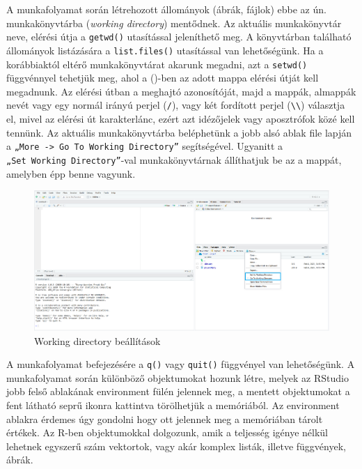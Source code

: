 \documentclass[
]{book}
\begin{document}
A munkafolyamat során létrehozott állományok (ábrák, fájlok) ebbe az ún.
munkakönyvtárba (\emph{working directory}) mentődnek. Az aktuális
munkakönyvtár neve, elérési útja a \texttt{getwd()} utasítással
jeleníthető meg. A könyvtárban található állományok listázására a
\texttt{list.files()} utasítással van lehetőségünk. Ha a korábbiaktól
eltérő munkakönyvtárat akarunk megadni, azt a \texttt{setwd()}
függvénnyel tehetjük meg, ahol a ()-ben az adott mappa elérési útját
kell megadnunk. Az elérési útban a meghajtó azonosítóját, majd a mappák,
almappák nevét vagy egy normál irányú perjel (\texttt{/}), vagy két
fordított perjel (\texttt{\textbackslash{}\textbackslash{}}) választja
el, mivel az elérési út karakterlánc, ezért azt idézőjelek vagy
aposztrófok közé kell tennünk. Az aktuális munkakönyvtárba beléphetünk a
jobb alsó ablak file lapján a
\texttt{„More\ -\textgreater{}\ Go\ To\ Working\ Directory”}
segítségével. Ugyanitt a \texttt{„Set\ Working\ Directory”}-val
munkakönyvtárnak állíthatjuk be az a mappát, amelyben épp benne vagyunk.

\begin{figure}

{\centering \includegraphics[width=0.9\linewidth]{figures/13-03_working_directory} 

}

\caption{Working directory beállítások}\label{fig:unnamed-chunk-46}
\end{figure}

A munkafolyamat befejezésére a \texttt{q()} vagy \texttt{quit()}
függvényel van lehetőségünk. A munkafolyamat során különböző
objektumokat hozunk létre, melyek az RStudio jobb felső ablakának
environment fülén jelennek meg, a mentett objektumokat a fent látható
seprű ikonra kattintva törölhetjük a memóriából. Az environment ablakra
érdemes úgy gondolni hogy ott jelennek meg a memóriában tárolt értékek.
Az R-ben objektumokkal dolgozunk, amik a teljesség igénye nélkül
lehetnek egyszerű szám vektortok, vagy akár komplex listák, illetve
függvények, ábrák.
\end{document}
